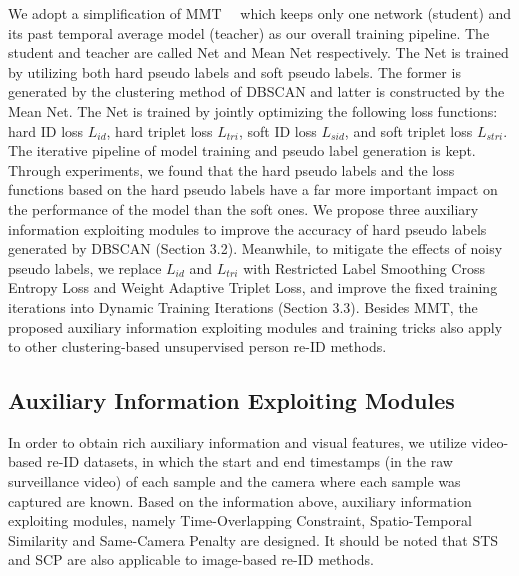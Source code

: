 \documentclass[10pt,twocolumn,letterpaper]{article}
\begin{document}
We adopt a simplification of MMT~\cite{mmt}~\cite{mmt2} which keeps only one network (student) and its past temporal average model (teacher) as our overall training pipeline. The student and teacher are called Net and Mean Net respectively. The Net is trained by utilizing both hard pseudo labels and soft pseudo labels. The former is generated by the clustering method of DBSCAN and latter is constructed by the Mean Net. The Net is trained by jointly optimizing the following loss functions: hard ID loss $L_{id}$, hard triplet loss $L_{tri}$, soft ID loss $L_{sid}$, and soft triplet loss $L_{stri}$. The iterative pipeline of model training and pseudo label generation is kept. Through experiments, we found that the hard pseudo labels and the loss functions based on the hard pseudo labels have a far more important impact on the performance of the model than the soft ones. We propose three auxiliary information exploiting modules to improve the accuracy of hard pseudo labels generated by DBSCAN (Section 3.2). Meanwhile, to mitigate the effects of noisy pseudo labels, we replace $L_{id}$ and $L_{tri}$ with Restricted Label Smoothing Cross Entropy Loss and Weight Adaptive Triplet Loss, and improve the fixed training iterations into Dynamic Training Iterations (Section 3.3). Besides MMT, the proposed auxiliary information exploiting modules and training tricks also apply to other clustering-based unsupervised person re-ID methods.

\subsection{Auxiliary Information Exploiting Modules}

In order to obtain rich auxiliary information and visual features, we utilize video-based re-ID datasets, in which the start and end timestamps (in the raw surveillance video) of each sample and the camera where each sample was captured are known. Based on the information above, auxiliary information exploiting modules, namely Time-Overlapping Constraint, Spatio-Temporal Similarity and Same-Camera Penalty are designed. It should be noted that STS and SCP are also applicable to image-based re-ID methods.
\end{document}
